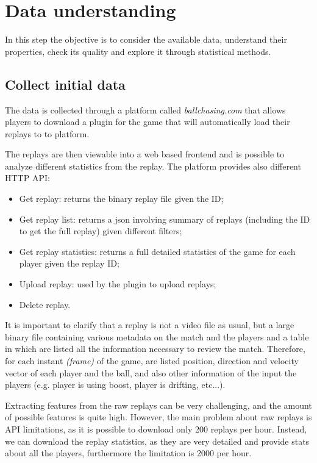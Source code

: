 \section{Data understanding} \label{seq:data_understanding}

 In this step the objective is to consider the available data, understand their properties, check its quality and explore it through statistical methods.

 \subsection{Collect initial data}

The data is collected through a platform called \textit{ballchasing.com} that allows players to download a plugin for the game that will automatically load their replays to to platform.

The replays are then viewable into a web based frontend and is possible to analyze different statistics from the replay. The platform provides also different HTTP API:

\begin{itemize}
    \item Get replay: returns the binary replay file given the ID;
    \item Get replay list: returns a json involving summary of replays (including the ID to get the full replay) given different filters;
    \item Get replay statistics: returns a full detailed statistics of the game for each player given the replay ID;
    \item Upload replay: used by the plugin to upload replays;
    \item Delete replay.
\end{itemize}

It is important to clarify that a replay is not a video file as usual, but a large binary file containing various metadata on the match and the players and a table in which are listed all the information necessary to review the match.
Therefore, for each instant \textit{(frame)} of the game, are listed position, direction and velocity vector of each player and the ball, and also other information of the input the players (e.g. player is using boost, player is drifting, etc...).

Extracting features from the raw replays can be very challenging, and the amount of possible features is quite high. However, the main problem about raw replays is API limitations, as it is possible to download only 200 replays per hour. Instead, we can download the replay statistics, as they are very detailed and provide stats about all the players, furthermore the limitation is 2000 per hour.

